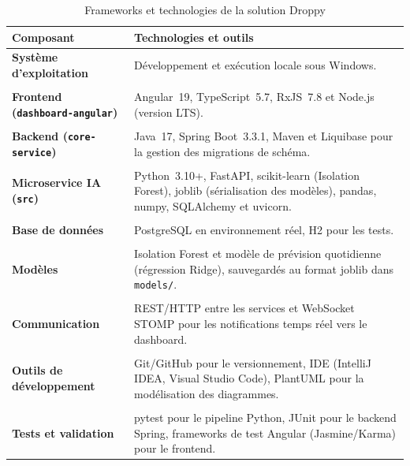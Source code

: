 \begin{table}[H]
\centering
\caption{Frameworks et technologies de la solution Droppy}
\label{tab:environnement-travail}

\renewcommand{\arraystretch}{1.35}

\begin{tabularx}{\textwidth}{
    >{\bfseries}p{3.6cm}
    >{\raggedright\arraybackslash}X
}

\toprule
Composant & Technologies et outils \\
\midrule

Système d'exploitation &
Développement et exécution locale sous Windows. \\
\\[2pt]

Frontend (\texttt{dashboard-angular}) &
Angular~19, TypeScript~5.7, RxJS~7.8 et Node.js (version LTS). \\
\\[2pt]

Backend (\texttt{core-service}) &
Java~17, Spring Boot~3.3.1, Maven et Liquibase pour la gestion des
migrations de schéma. \\
\\[2pt]

Microservice IA (\texttt{src}) &
Python~3.10+, FastAPI, scikit-learn (Isolation Forest), joblib
(sérialisation des modèles), pandas, numpy, SQLAlchemy et uvicorn. \\
\\[2pt]

Base de données &
PostgreSQL en environnement réel, H2 pour les tests. \\
\\[2pt]

Modèles &
Isolation Forest et modèle de prévision quotidienne (régression Ridge),
sauvegardés au format joblib dans \texttt{models/}. \\
\\[2pt]

Communication &
REST/HTTP entre les services et WebSocket STOMP pour les notifications
temps réel vers le dashboard. \\
\\[2pt]

Outils de développement &
Git/GitHub pour le versionnement, IDE (IntelliJ IDEA, Visual Studio Code),
PlantUML pour la modélisation des diagrammes. \\
\\[2pt]

Tests et validation &
pytest pour le pipeline Python, JUnit pour le backend Spring, frameworks
de test Angular (Jasmine/Karma) pour le frontend. \\

\bottomrule

\end{tabularx}
\end{table}

